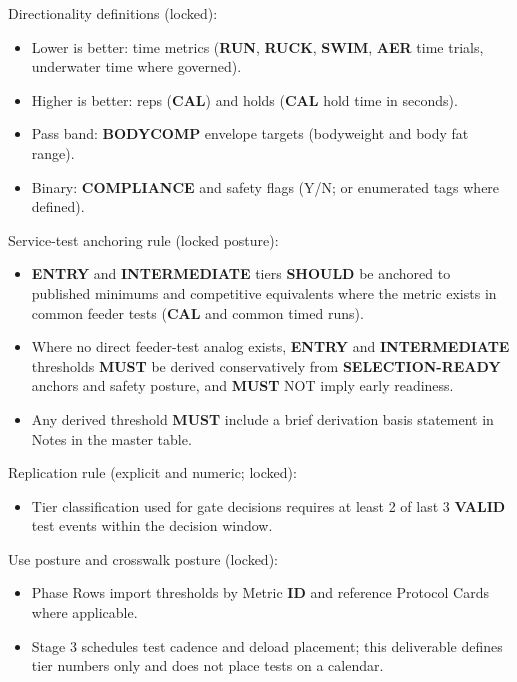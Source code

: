 \documentclass[10pt]{article}
\begin{document}
Directionality definitions (locked):

\begin{itemize}
\item Lower is better: time metrics (\textbf{RUN}, \textbf{RUCK}, \textbf{SWIM}, \textbf{AER} time trials, underwater time where governed).
\item Higher is better: reps (\textbf{CAL}) and holds (\textbf{CAL} hold time in seconds).
\item Pass band: \textbf{BODYCOMP} envelope targets (bodyweight and body fat range).
\item Binary: \textbf{COMPLIANCE} and safety flags (Y/N; or enumerated tags where defined).
\end{itemize}

Service-test anchoring rule (locked posture):

\begin{itemize}
\item \textbf{ENTRY} and \textbf{INTERMEDIATE} tiers \textbf{SHOULD} be anchored to published minimums and competitive equivalents where the metric exists in common feeder tests (\textbf{CAL} and common timed runs).
\item Where no direct feeder-test analog exists, \textbf{ENTRY} and \textbf{INTERMEDIATE} thresholds \textbf{MUST} be derived conservatively from \textbf{SELECTION-READY} anchors and safety posture, and \textbf{MUST} NOT imply early readiness.
\item Any derived threshold \textbf{MUST} include a brief derivation basis statement in Notes in the master table.
\end{itemize}

Replication rule (explicit and numeric; locked):

\begin{itemize}
\item Tier classification used for gate decisions requires at least 2 of last 3 \textbf{VALID} test events within the decision window.
\end{itemize}

Use posture and crosswalk posture (locked):

\begin{itemize}
\item Phase Rows import thresholds by Metric \textbf{ID} and reference Protocol Cards where applicable.
\item Stage 3 schedules test cadence and deload placement; this deliverable defines tier numbers only and does not place tests on a calendar.
\end{itemize}
\end{document}
